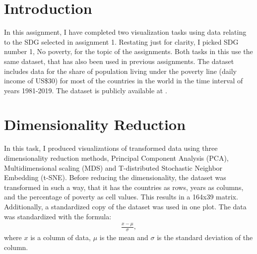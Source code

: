 \documentclass[11pt,a4paper,titlepage]{article}
\begin{document}



\section*{Introduction}

In this assignment, I have completed two visualization tasks using data relating to the SDG selected in assignment 1. Restating just for clarity, I picked SDG number 1, No poverty, for the topic of the assignments. Both tasks in this use the same dataset, that has also been used in previous assignments. The dataset includes data for the share of population living under the poverty line (daily income of US\$30) for most of the countries in the world in the time interval of years 1981-2019. The dataset is publicly available at \cite{data}.

\section{Dimensionality Reduction}

In this task, I produced visualizations of transformed data using three dimensionality reduction methods, Principal Component Analysis (PCA), Multidimensional scaling (MDS) and T-distributed Stochastic Neighbor Embedding (t-SNE). Before reducing the dimensionality, the dataset was transformed in such a way, that it has the countries as rows, years as columns, and the percentage of poverty as cell values. This results in a 164x39 matrix. Additionally, a standardized copy of the dataset was used in one plot. The data was standardized with the formula:
\begin{align*}
    \frac{x - \mu}{\sigma},
\end{align*} where $x$ is a column of data, $\mu$ is the mean and $\sigma$ is the standard deviation of the column.
\end{document}
